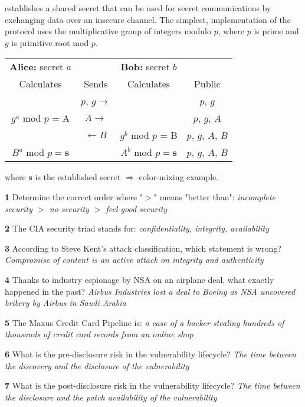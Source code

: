  establishes a shared secret that can be used for secret communications by exchanging data over an insecure channel. The simplest,  implementation of the protocol uses the multiplicative group of integers modulo $p$, where $p$ is prime and $g$ is primitive root mod $p$.

\begin{tabular}{ccc|c}
\multicolumn{1}{c}{\textbf{Alice:} secret $a$} & &  \multicolumn{1}{c}{\textbf{Bob:} secret $b$} & \\
Calculates & Sends & Calculates & Public \\
\hline
\hline
 & $p$, $g\to$ & & $p$, $g$ \\
$g^a$ mod $p$ = A & $A\to$ & & $p$, $g$, $A$ \\
 & $\leftarrow B$ &$g^b$ mod $p$ = B & $p$, $g$, $A$, $B$ \\
 $B^a$ mod $p = \mathbf{s}$ & & $A^b$ mod $p = \mathbf{s}$ & $p$, $g$, $A$, $B$ \\
\end{tabular}

where $\mathbf{s}$ is the established secret $\Rightarrow$ color-mixing example.

 
\textbf{  1}  Determine the correct order where "$>$" means "better than":  
\textit{ incomplete security $>$ no security $>$ feel-good security}

\textbf{  2}  The CIA security triad stands for:  
\textit{ confidentiality, integrity, availability}

\textbf{  3}  According to Steve Kent's attack classification, which statement is wrong?  
\textit{ Compromise of content is an active attack on integrity and authenticity}

\textbf{  4}  Thanks to industry espionage by NSA on an airplane deal, what exactly happened in the past?  
\textit{ Airbus Industries lost a deal to Boeing as NSA uncovered bribery by Airbus in Saudi Arabia}

\textbf{  5}  The Maxus Credit Card Pipeline is:  
\textit{ a case of a hacker stealing hundreds of thousands of credit card records from an online shop}

\textbf{  6}  What is the pre-disclosure risk in the vulnerability lifecycle?  
\textit{ The time between the discovery and the disclosure of the vulnerability}

\textbf{  7}  What is the post-disclosure risk in the vulnerability lifecycle?  
\textit{ The time between the disclosure and the patch availability of the vulnerability}

